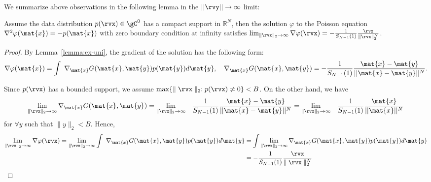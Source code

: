 We summarize above observations in the following lemma in the $||\rvy|| \to \infty$ limit: 
\begin{lemma}
\label{lemma:point}
Assume the data distribution $p(\rvx) \in \gC^0$ has a compact support in $\mathbb{R}^N$, then the solution $\varphi$ to the Poisson equation $\nabla^2\varphi(\mat{x})=-p(\mat{x})$ with zero boundary condition at infinity satisfies $\lim_{\parallel \rvx \parallel_2 \to \infty} \nabla \varphi(\rvx) = -\frac{1}{S_{N-1}(1)}\frac{\rvx}{\parallel \rvx\parallel^N_2 }$.
\end{lemma}
\begin{proof}
By Lemma~\ref{lemma:ex-uni}, the gradient of the solution has the following form:
\begin{align*}
    \nabla \varphi(\mat{x}) = \int\ \nabla_\mat{x}G(\mat{x},\mat{y})p(\mat{y})d\mat{y},\quad \nabla_\mat{x} G(\mat{x},\mat{y}) = -\frac{1}{S_{N-1}(1)} \frac{\mat{x}-\mat{y}}{||\mat{x}-\mat{y}||^{N}}.
\end{align*}

Since $p(\rvx)$ has a bounded support, we assume $\max\{\parallel \rvx \parallel_2: p(\rvx) \not = 0\}<B$. On the other hand, we have
\begin{align*}
    \lim_{\parallel \rvx \parallel_2 \to \infty}\nabla_\mat{x} G(\mat{x},\mat{y}) =\lim_{\parallel \rvx \parallel_2 \to \infty} -\frac{1}{S_{N-1}(1)} \frac{\mat{x}-\mat{y}}{||\mat{x}-\mat{y}||^{N}}=\lim_{\parallel \rvx \parallel_2 \to \infty}-\frac{1}{S_{N-1}(1)} \frac{\mat{x}}{||\mat{x}||^{N}}
\end{align*}
for $\forall y$ such that $\parallel y \parallel_2 < B$. Hence,
\begin{align*}
    \lim_{\parallel \rvx \parallel_2 \to \infty} \nabla \varphi(\rvx) =\lim_{\parallel \rvx \parallel_2 \to \infty}\int\ \nabla_\mat{x}G(\mat{x},\mat{y})p(\mat{y})d\mat{y}&= \int\lim_{\parallel \rvx \parallel_2 \to \infty} \nabla_\mat{x}G(\mat{x},\mat{y})p(\mat{y})d\mat{y}\\
    &=-\frac{1}{S_{N-1}(1)}\frac{\rvx}{\parallel \rvx\parallel^N_2 }
\end{align*}

\end{proof}







